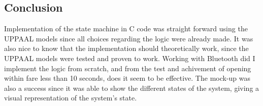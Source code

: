 \subsection{Conclusion}

Implementation of the state machine in C code was straight forward using the UPPAAL models since all choices regarding the logic were already made.
It was also nice to know that the implementation should theoretically work, since the UPPAAL models were tested and proven to work.
Working with Bluetooth did I implement the logic from scratch, and from the test and achivement of opening within fare less than 10 seconds, does it seem to be effective.
The mock-up was also a success since it was able to show the different states of the system, giving a visual representation of the system's state.